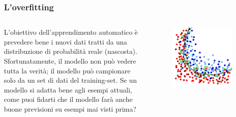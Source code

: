 \begin{frame}

	\frametitle{L'overfitting}

	\begin{columns}
			L'obiettivo dell'apprendimento automatico è prevedere bene i nuovi dati tratti da una distribuzione di probabilità reale (nascosta).
			\newlinedouble
			Sfortunatamente, il modello non può vedere tutta la verità; il modello può campionare solo da un set di dati del training-set.
			\newlinedouble
			Se un modello si adatta bene agli esempi attuali, come puoi fidarti che il modello farà anche buone previsioni su esempi mai visti prima?

			\begin{figure}[!htbp]
				\centering
				\includegraphics[width=1.0\linewidth]{images/supervised/validation_test_training_peril_of_overfitting/overfitting_black_green_lines_with_test.pdf}
			\end{figure}

	\end{columns}
\end{frame}


